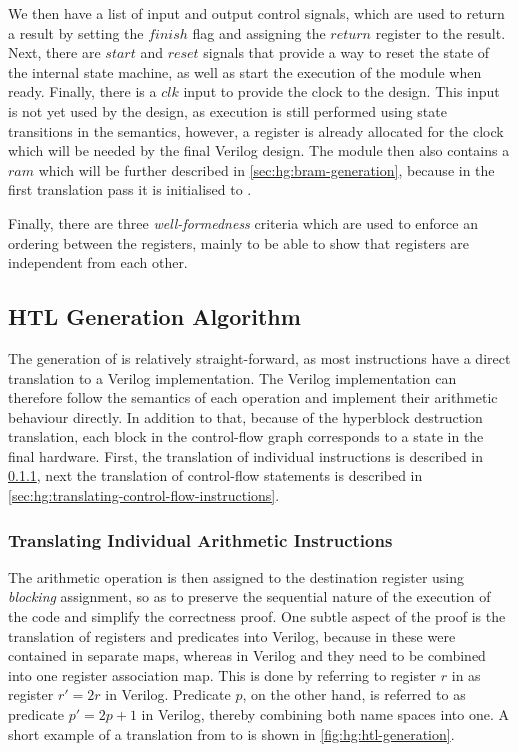 We then have a list of input and output control signals, which are used to
return a result by setting the $\mathit{finish}$ flag and assigning the
$\mathit{return}$ register to the result.  Next, there are $\mathit{start}$ and
$\mathit{reset}$ signals that provide a way to reset the state of the internal
state machine, as well as start the execution of the module when ready.
Finally, there is a $\mathit{clk}$ input to provide the clock to the design.
This input is not yet used by the \htl{} design, as execution is still performed
using state transitions in the semantics, however, a register is already
allocated for the clock which will be needed by the final Verilog design.  The
module then also contains a $\mathit{ram}$ which will be further described in
\cref{sec:hg:bram-generation}, because in the first translation pass it is
initialised to \cnone.

Finally, there are three \emph{well-formedness} criteria which are used to
enforce an ordering between the registers, mainly to be able to show that
registers are independent from each other.

\subsection{HTL Generation Algorithm}%
\label{sec:hg:htl-generation}

The generation of \htl{} is relatively straight-forward, as most instructions
have a direct translation to a Verilog implementation.  The Verilog
implementation can therefore follow the semantics of each operation and
implement their arithmetic behaviour directly.  In addition to that, because of
the hyperblock destruction translation, each block in the control-flow graph
corresponds to a state in the final hardware.  First, the translation of
individual instructions is described in
\cref{sec:hg:translating-individual-arithmetic-instructions}, next the
translation of control-flow statements is described in
\cref{sec:hg:translating-control-flow-instructions}.

\subsubsection{Translating Individual Arithmetic Instructions}%
\label{sec:hg:translating-individual-arithmetic-instructions}

The arithmetic operation is then assigned to the destination register using
\emph{blocking} assignment, so as to preserve the sequential nature of the
execution of the code and simplify the correctness proof.  One subtle aspect of
the proof is the translation of registers and predicates into Verilog, because
in \rtlsubpar{} these were contained in separate maps, whereas in Verilog and
\htl{} they need to be combined into one register association map.  This is done
by referring to register $r$ in \rtlsubpar{} as register $r' = 2r$ in Verilog.
Predicate $p$, on the other hand, is referred to as predicate $p' = 2p + 1$ in
Verilog, thereby combining both name spaces into one.  A short example of a
translation from \rtlsubpar{} to \htl{} is shown in
\cref{fig:hg:htl-generation}.

